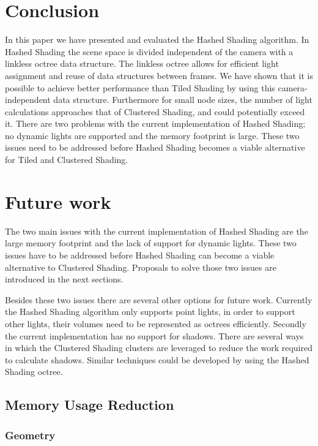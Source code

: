 \section{Conclusion}

In this paper we have presented and evaluated the Hashed Shading algorithm. In Hashed Shading
the scene space is divided independent of the camera with a linkless octree data structure.
The linkless octree allows for efficient light assignment and reuse of data structures between
frames. We have shown that it is possible to achieve better performance than Tiled Shading
by using this camera-independent data structure. Furthermore for small node sizes, the
number of light calculations approaches that of Clustered Shading, and could potentially
exceed it. There are two problems with the current implementation of Hashed Shading;
no dynamic lights are supported and the memory footprint is large. These two issues need
to be addressed before Hashed Shading becomes a viable alternative for Tiled and Clustered
Shading.

\section{Future work}

The two main issues with the current implementation of Hashed Shading are the large memory
footprint and the lack of support for dynamic lights. These two issues have to be addressed
before Hashed Shading can become a viable alternative to Clustered Shading. Proposals
to solve those two issues are introduced in the next sections.

Besides these two issues there are several other options for future work. Currently
the Hashed Shading algorithm only supports point lights, in order to support other
lights, their volumes need to be represented as octrees efficiently. Secondly
the current implementation has no support for shadows. There are several ways in which
the Clustered Shading clusters are leveraged to reduce the work required to calculate
shadows\cite{}. Similar techniques could be developed by using the Hashed Shading octree.

\subsection{Memory Usage Reduction}
\subsubsection{Geometry}

